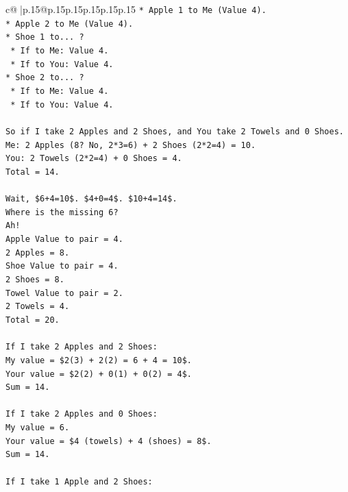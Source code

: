\documentclass{article}
\begin{document}
{\begin{supertabular}{c@{$\;$}|p{.15\linewidth}@{}p{.15\linewidth}p{.15\linewidth}p{.15\linewidth}p{.15\linewidth}p{.15\linewidth}}
{{{\texttt{*   Apple 1 to Me (Value 4).} \\
\texttt{*   Apple 2 to Me (Value 4).} \\
\texttt{*   Shoe 1 to... ?} \\
\texttt{    *   If to Me: Value 4.} \\
\texttt{    *   If to You: Value 4.} \\
\texttt{*   Shoe 2 to... ?} \\
\texttt{    *   If to Me: Value 4.} \\
\texttt{    *   If to You: Value 4.} \\
\\ 
\texttt{So if I take 2 Apples and 2 Shoes, and You take 2 Towels and 0 Shoes.} \\
\texttt{Me: 2 Apples (8? No, 2*3=6) + 2 Shoes (2*2=4) = 10.} \\
\texttt{You: 2 Towels (2*2=4) + 0 Shoes = 4.} \\
\texttt{Total = 14.} \\
\\ 
\texttt{Wait, \$6+4=10\$. \$4+0=4\$. \$10+4=14\$.} \\
\texttt{Where is the missing 6?} \\
\texttt{Ah!} \\
\texttt{Apple Value to pair = 4.} \\
\texttt{2 Apples = 8.} \\
\texttt{Shoe Value to pair = 4.} \\
\texttt{2 Shoes = 8.} \\
\texttt{Towel Value to pair = 2.} \\
\texttt{2 Towels = 4.} \\
\texttt{Total = 20.} \\
\\ 
\texttt{If I take 2 Apples and 2 Shoes:} \\
\texttt{My value = \$2(3) + 2(2) = 6 + 4 = 10\$.} \\
\texttt{Your value = \$2(2) + 0(1) + 0(2) = 4\$.} \\
\texttt{Sum = 14.} \\
\\ 
\texttt{If I take 2 Apples and 0 Shoes:} \\
\texttt{My value = 6.} \\
\texttt{Your value = \$4 (towels) + 4 (shoes) = 8\$.} \\
\texttt{Sum = 14.} \\
\\ 
\texttt{If I take 1 Apple and 2 Shoes:} \\
}}}
\end{supertabular}}
\end{document}
